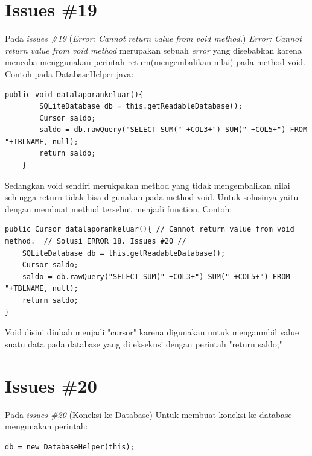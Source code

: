 \section{Issues \#19}
Pada \textit{issues \#19} (\textit{Error: Cannot return value from void method.}) \textit{Error: Cannot return value from void method} merupakan sebuah \textit{error} yang disebabkan karena mencoba menggunakan perintah return(mengembalikan nilai) pada method void. Contoh pada DatabaseHelper.java:
\begin{verbatim}
public void datalaporankeluar(){ 
        SQLiteDatabase db = this.getReadableDatabase();
        Cursor saldo;
        saldo = db.rawQuery("SELECT SUM(" +COL3+")-SUM(" +COL5+") FROM "+TBLNAME, null);
        return saldo;
    }
\end{verbatim}
Sedangkan void sendiri merukpakan method yang tidak mengembalikan nilai sehingga return tidak bisa digunakan pada method void. Untuk solusinya yaitu dengan membuat methud tersebut menjadi function. Contoh: 
\begin{verbatim}
public Cursor datalaporankeluar(){ // Cannot return value from void method.  // Solusi ERROR 18. Issues #20 //
    SQLiteDatabase db = this.getReadableDatabase();
    Cursor saldo;
    saldo = db.rawQuery("SELECT SUM(" +COL3+")-SUM(" +COL5+") FROM "+TBLNAME, null);
    return saldo;
}
\end{verbatim}
Void disini diubah menjadi "cursor" karena digunakan untuk menganmbil value suatu data pada database yang di eksekusi dengan perintah "return saldo;"

\section{Issues \#20}
Pada \textit{issues \#20} (Koneksi ke Database) Untuk membuat koneksi ke database mengunakan perintah:
\begin{verbatim}
db = new DatabaseHelper(this);
\end{verbatim}